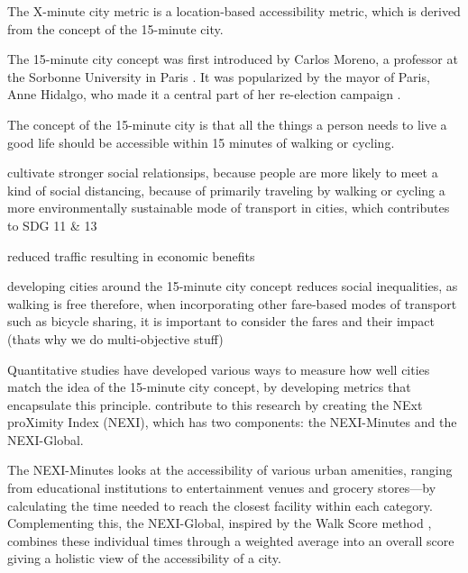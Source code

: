 
The X-minute city metric is a location-based accessibility metric, which is derived from the concept of the 15-minute city.

The 15-minute city concept was first introduced by Carlos Moreno, a professor at the Sorbonne University in Paris \cite{morenoIntroducing15MinuteCity2021}.
It was popularized by the mayor of Paris, Anne Hidalgo, who made it a central part of her re-election campaign \cite{gongadzeParisVision15Minute2023}.

The concept of the 15-minute city is that all the things a person needs to live a good life should be accessible within 15 minutes of walking or cycling.

cultivate stronger social relationsips, because people are more likely to meet \cite{allamProximityBasedPlanning15Minute2020}
a kind of social distancing, because of primarily traveling by walking or cycling \cite{allamProximityBasedPlanning15Minute2020}
a more environmentally sustainable mode of transport in cities, which contributes to SDG 11 \& 13 \cite{allamProximityBasedPlanning15Minute2020} \cite{papasUrbanMobilityEvolution2023}

reduced traffic resulting in economic benefits \cite{allamProximityBasedPlanning15Minute2020} \cite{papasUrbanMobilityEvolution2023}

developing cities around the 15-minute city concept reduces social inequalities, as walking is free \cite{weng15minuteWalkableNeighborhoods2019b} \cite{gustafsonExaminingSpatialChange2022}
therefore, when incorporating other fare-based modes of transport such as bicycle sharing, it is important to consider the fares and their impact (thats why we do multi-objective stuff)

Quantitative studies have developed various ways to measure how well cities match the idea of the 15-minute city concept,  by developing metrics that encapsulate this principle.  
\cite{olivariAreItalianCities2023} contribute to this research by creating the NExt proXimity Index (NEXI), which has two components: the NEXI-Minutes and the NEXI-Global. 

The NEXI-Minutes looks at the accessibility of various urban amenities, ranging from educational institutions to entertainment venues and grocery stores—by calculating the time needed to reach the closest facility within each category.
Complementing this, the NEXI-Global, inspired by the Walk Score method \cite{WalkScoreMethodology}, combines these individual times through a weighted average into an overall score giving a holistic view of the accessibility of a city.

